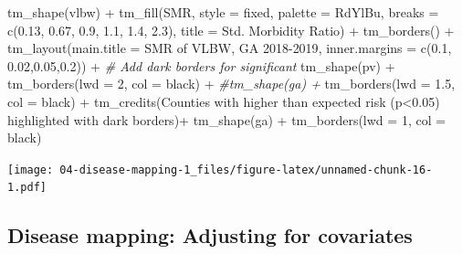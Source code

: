 \documentclass[
]{book}
\newenvironment{Shaded}{\begin{snugshade}}{\end{snugshade}}
\newcommand{\AttributeTok}[1]{\textcolor[rgb]{0.77,0.63,0.00}{#1}}
\newcommand{\CommentTok}[1]{\textcolor[rgb]{0.56,0.35,0.01}{\textit{#1}}}
\newcommand{\DecValTok}[1]{\textcolor[rgb]{0.00,0.00,0.81}{#1}}
\newcommand{\FloatTok}[1]{\textcolor[rgb]{0.00,0.00,0.81}{#1}}
\newcommand{\FunctionTok}[1]{\textcolor[rgb]{0.00,0.00,0.00}{#1}}
\newcommand{\NormalTok}[1]{#1}
\newcommand{\SpecialCharTok}[1]{\textcolor[rgb]{0.00,0.00,0.00}{#1}}
\newcommand{\StringTok}[1]{\textcolor[rgb]{0.31,0.60,0.02}{#1}}
\begin{document}
\begin{Shaded}
\begin{Highlighting}[]
\FunctionTok{tm\_shape}\NormalTok{(vlbw) }\SpecialCharTok{+}
  \FunctionTok{tm\_fill}\NormalTok{(}\StringTok{\textquotesingle{}SMR\textquotesingle{}}\NormalTok{,}
          \AttributeTok{style =} \StringTok{\textquotesingle{}fixed\textquotesingle{}}\NormalTok{,}
          \AttributeTok{palette =} \StringTok{\textquotesingle{}{-}RdYlBu\textquotesingle{}}\NormalTok{,}
          \AttributeTok{breaks =} \FunctionTok{c}\NormalTok{(}\FloatTok{0.13}\NormalTok{, }\FloatTok{0.67}\NormalTok{, }\FloatTok{0.9}\NormalTok{, }\FloatTok{1.1}\NormalTok{, }\FloatTok{1.4}\NormalTok{, }\FloatTok{2.3}\NormalTok{),}
          \AttributeTok{title =} \StringTok{\textquotesingle{}Std. Morbidity Ratio\textquotesingle{}}\NormalTok{) }\SpecialCharTok{+} 
  \FunctionTok{tm\_borders}\NormalTok{() }\SpecialCharTok{+}
  \FunctionTok{tm\_layout}\NormalTok{(}\AttributeTok{main.title =} \StringTok{\textquotesingle{}SMR of VLBW, GA 2018{-}2019\textquotesingle{}}\NormalTok{,}
            \AttributeTok{inner.margins =} \FunctionTok{c}\NormalTok{(}\FloatTok{0.1}\NormalTok{, }\FloatTok{0.02}\NormalTok{,}\FloatTok{0.05}\NormalTok{,}\FloatTok{0.2}\NormalTok{)) }\SpecialCharTok{+}
  \CommentTok{\# Add dark borders for significant}
  \FunctionTok{tm\_shape}\NormalTok{(pv) }\SpecialCharTok{+}
  \FunctionTok{tm\_borders}\NormalTok{(}\AttributeTok{lwd =} \DecValTok{2}\NormalTok{, }\AttributeTok{col =} \StringTok{\textquotesingle{}black\textquotesingle{}}\NormalTok{) }\SpecialCharTok{+}
  \CommentTok{\#tm\_shape(ga) + }
  \FunctionTok{tm\_borders}\NormalTok{(}\AttributeTok{lwd =} \FloatTok{1.5}\NormalTok{, }\AttributeTok{col =} \StringTok{\textquotesingle{}black\textquotesingle{}}\NormalTok{) }\SpecialCharTok{+}
  \FunctionTok{tm\_credits}\NormalTok{(}\StringTok{\textquotesingle{}Counties with higher than expected risk (p\textless{}0.05) highlighted with dark borders\textquotesingle{}}\NormalTok{)}\SpecialCharTok{+}
  \FunctionTok{tm\_shape}\NormalTok{(ga) }\SpecialCharTok{+}
  \FunctionTok{tm\_borders}\NormalTok{(}\AttributeTok{lwd =} \DecValTok{1}\NormalTok{, }\AttributeTok{col =} \StringTok{\textquotesingle{}black\textquotesingle{}}\NormalTok{)}
\end{Highlighting}
\end{Shaded}

\texttt{[image: 04-disease-mapping-1\_files/figure-latex/unnamed-chunk-16-1.pdf]}

\hypertarget{disease-mapping-adjusting-for-covariates}{%
\subsection{Disease mapping: Adjusting for covariates}\label{disease-mapping-adjusting-for-covariates}}
\end{document}
